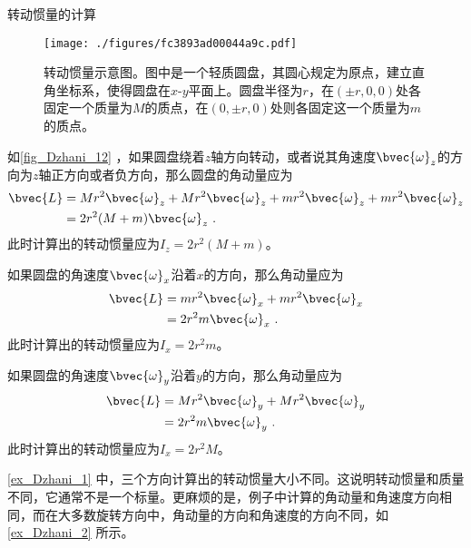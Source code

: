 \begin{example}{转动惯量的计算}\label{ex_Dzhani_1}


\begin{figure}[ht]
\centering
\texttt{[image: ./figures/fc3893ad00044a9c.pdf]}
\caption{转动惯量示意图。图中是一个轻质圆盘，其圆心规定为原点，建立直角坐标系，使得圆盘在$x$-$y$平面上。圆盘半径为$r$，在$(\pm r, 0, 0)$处各固定一个质量为$M$的质点，在$(0, \pm r, 0)$处则各固定这一个质量为$m$的质点。} \label{fig_Dzhani_12}
\end{figure}


如\autoref{fig_Dzhani_12} ，如果圆盘绕着$z$轴方向转动，或者说其角速度$\bvec{\omega}_z$的方向为$z$轴正方向或者负方向，那么圆盘的角动量应为
\begin{equation}
\begin{aligned}
\bvec{L} ={}& Mr^2\bvec{\omega}_z+Mr^2\bvec{\omega}_z+mr^2\bvec{\omega}_z+mr^2\bvec{\omega}_z\\
={}& 2r^2(M+m)\bvec{\omega}_z ~.
\end{aligned}
\end{equation}
此时计算出的转动惯量应为$I_z=2r^2(M+m)$。

如果圆盘的角速度$\bvec{\omega}_x$沿着$x$的方向，那么角动量应为
\begin{equation}
\begin{aligned}
\bvec{L} ={}& mr^2\bvec{\omega}_x+mr^2\bvec{\omega}_x\\
={}& 2r^2m\bvec{\omega}_x ~.
\end{aligned}
\end{equation}
此时计算出的转动惯量应为$I_x=2r^2m$。

如果圆盘的角速度$\bvec{\omega}_y$沿着$y$的方向，那么角动量应为
\begin{equation}
\begin{aligned}
\bvec{L} ={}& Mr^2\bvec{\omega}_y+Mr^2\bvec{\omega}_y\\
={}& 2r^2m\bvec{\omega}_y ~.
\end{aligned}
\end{equation}
此时计算出的转动惯量应为$I_x=2r^2M$。




\end{example}



\autoref{ex_Dzhani_1} 中，三个方向计算出的转动惯量大小不同。这说明转动惯量和质量不同，它通常不是一个标量。更麻烦的是，例子中计算的角动量和角速度方向相同，而在大多数旋转方向中，角动量的方向和角速度的方向不同，如\autoref{ex_Dzhani_2} 所示。


